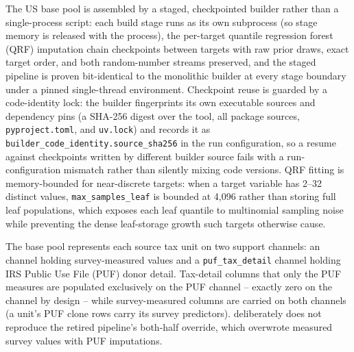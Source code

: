 The US base pool is assembled by a staged, checkpointed builder rather
than a single-process script: each build stage runs as its own subprocess
(so stage memory is released with the process), the per-target quantile
regression forest (QRF) imputation chain checkpoints between targets with
raw prior draws, exact target order, and both random-number streams
preserved, and the staged pipeline is proven bit-identical to the
monolithic builder at every stage boundary under a pinned single-thread
environment.
Checkpoint reuse is guarded by a code-identity lock: the builder
fingerprints its own executable sources and dependency pins (a SHA-256
digest over the tool, all package sources, \texttt{pyproject.toml}, and
\texttt{uv.lock}) and records it as
\texttt{builder\_code\_identity.source\_sha256} in the run configuration,
so a resume against checkpoints written by different builder source fails
with a run-configuration mismatch rather than silently mixing code
versions.
QRF fitting is memory-bounded for near-discrete targets: when a target
variable has 2--32 distinct values, \texttt{max\_samples\_leaf} is bounded
at 4{,}096 rather than storing full leaf populations, which exposes each
leaf quantile to multinomial sampling noise while preventing the dense
leaf-storage growth such targets otherwise cause.

The base pool represents each source tax unit on two support channels: an
\asec{} channel holding survey-measured values and a
\texttt{puf\_tax\_detail} channel holding IRS Public Use File (PUF) donor
detail. Tax-detail columns that only the PUF measures are populated
exclusively on the PUF channel -- exactly zero on the \asec{} channel by
design -- while survey-measured columns are carried on both channels (a
unit's PUF clone rows carry its survey predictors). \microcosm{}
deliberately does not reproduce the retired pipeline's both-half override,
which overwrote measured survey values with PUF imputations.

